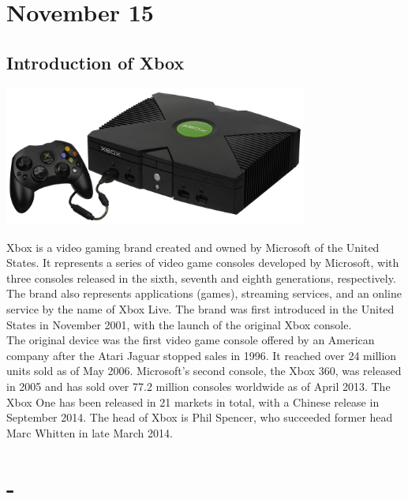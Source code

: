 \documentclass[11pt]{report}
\begin{document}
\section{November 15}
\subsection{Introduction of Xbox}
\vspace{2mm}\begin{center}\includegraphics[width=10cm]{./img/xbox1.jpg}\end{center}
Xbox is a video gaming brand created and owned by Microsoft of the United States. It represents a series of video game consoles developed by Microsoft, with three consoles released in the sixth, seventh and eighth generations, respectively. The brand also represents applications (games), streaming services, and an online service by the name of Xbox Live. The brand was first introduced in the United States in November 2001, with the launch of the original Xbox console.\\
The original device was the first video game console offered by an American company after the Atari Jaguar stopped sales in 1996. It reached over 24 million units sold as of May 2006. Microsoft's second console, the Xbox 360, was released in 2005 and has sold over 77.2 million consoles worldwide as of April 2013. The Xbox One has been released in 21 markets in total, with a Chinese release in September 2014. The head of Xbox is Phil Spencer, who succeeded former head Marc Whitten in late March 2014.
\section{-}
\end{document}
